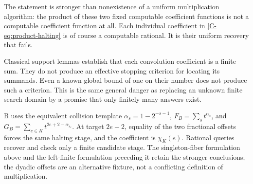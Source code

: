 \documentclass[11pt,letterpaper]{article}
\numberwithin{equation}{section}
\theoremstyle{definition}
\theoremstyle{remark}
\begin{document}
The statement is stronger than nonexistence of a uniform multiplication
algorithm: the product of these two fixed computable coefficient functions
is not a computable coefficient function at all. Each individual coefficient
in \eqref{C-eq:product-halting} is of course a computable rational. It is their
uniform recovery that fails.

Classical support lemmas establish that each convolution coefficient is a
finite sum. They do not produce an effective stopping criterion for locating
its summands. Even a known global bound of one on their number does not
produce such a criterion. This is the same general danger as replacing an
unknown finite search domain by a promise that only finitely many answers
exist.


B uses the equivalent collision template
$\alpha_s=1-2^{-s-1}$,
$F_B=\sum_s t^{\alpha_s}$, and
$G_B=\sum_{e\in K}t^{2e+2-\alpha_{s_e}}$.
At target $2e+2$, equality of the two fractional offsets forces the same
halting stage, and the coefficient is $\chi_K(e)$. Rational queries recover
and check only a finite candidate stage. The singleton-fiber formulation
above and the left-finite formulation preceding it retain the stronger
conclusions; the dyadic offsets are an alternative fixture, not a
conflicting definition of multiplication.
\end{document}
